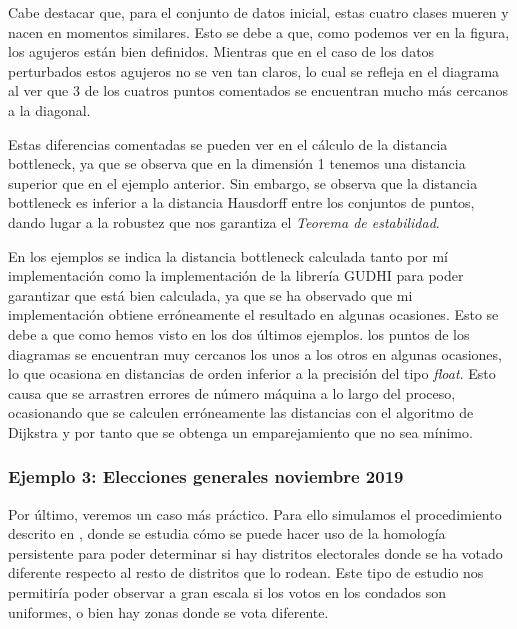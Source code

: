 Cabe destacar que, para el conjunto de datos inicial, estas cuatro clases mueren y nacen en momentos similares. Esto se debe a que, como podemos ver en la figura, los agujeros están bien definidos. Mientras que en el caso de los datos perturbados estos agujeros no se ven tan claros, lo cual se refleja en el diagrama al ver que 3 de los cuatros puntos comentados se encuentran mucho más cercanos a la diagonal.

Estas diferencias comentadas se pueden ver en el cálculo de la distancia bottleneck, ya que se observa que en la dimensión 1 tenemos una distancia superior que en el ejemplo anterior. Sin embargo, se observa que la distancia bottleneck es inferior a la distancia Hausdorff entre los conjuntos de puntos, dando lugar a la robustez que nos garantiza el \emph{Teorema de estabilidad}.

\begin{minipage}{\linewidth}
\end{minipage}

\begin{remark}
En los ejemplos se indica la distancia bottleneck calculada tanto por mí implementación como la implementación de la librería GUDHI \cite{gudhi:BottleneckDistance} para poder garantizar que está bien calculada, ya que se ha observado que mi implementación obtiene erróneamente el resultado en algunas ocasiones. Esto se debe a que como hemos visto en los dos últimos ejemplos. los puntos de los diagramas se encuentran muy cercanos los unos a los otros en algunas ocasiones, lo que ocasiona en distancias de orden inferior a la precisión del tipo \textit{float}. Esto causa que se arrastren errores de número máquina a lo largo del proceso, ocasionando que se calculen erróneamente las distancias con el algoritmo de Dijkstra y por tanto que se obtenga un emparejamiento que no sea mínimo. 
\end{remark}

\subsubsection{Ejemplo 3: Elecciones generales noviembre 2019}
Por último, veremos un caso más práctico. Para ello simulamos el procedimiento descrito en \cite{votosArticulo}, donde se estudia cómo se puede hacer uso de la homología persistente para poder determinar si hay distritos electorales donde se ha votado diferente respecto al resto de distritos que lo rodean. Este tipo de estudio nos permitiría poder observar a gran escala si los votos en los condados son uniformes, o bien hay zonas donde se vota diferente.


